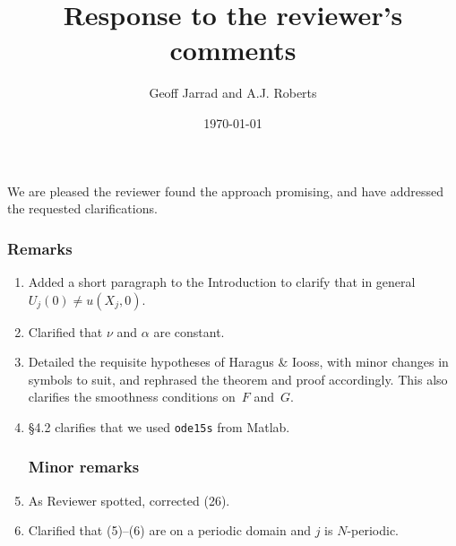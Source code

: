 \documentclass[11pt,a4paper]{article}
\title{Response to the reviewer's comments}
\author{Geoff Jarrad and A.J. Roberts}
\date{\today}
\begin{document}
\maketitle

We are pleased the reviewer found the approach promising, and have addressed the requested clarifications.
\subsubsection*{Remarks}
\begin{enumerate}
\item Added a short paragraph to the Introduction to clarify that in general \(U_j(0)\neq u(X_j,0)\).

\item Clarified that \(\nu\) and \(\alpha\) are constant.

\item Detailed the requisite hypotheses of Haragus \& Iooss, with minor changes in symbols to suit, and rephrased the theorem and proof accordingly.  This also clarifies the smoothness conditions on~\(F\) and~\(G\).

\item \S4.2 clarifies that we used \verb|ode15s| from Matlab.

\subsubsection*{Minor remarks}
\setcounter{enumi}{0}

\item As Reviewer spotted, corrected (26).

\item Clarified that (5)--(6) are on a periodic domain and \(j\) is \(N\)-periodic.

\end{enumerate}
\end{document}
